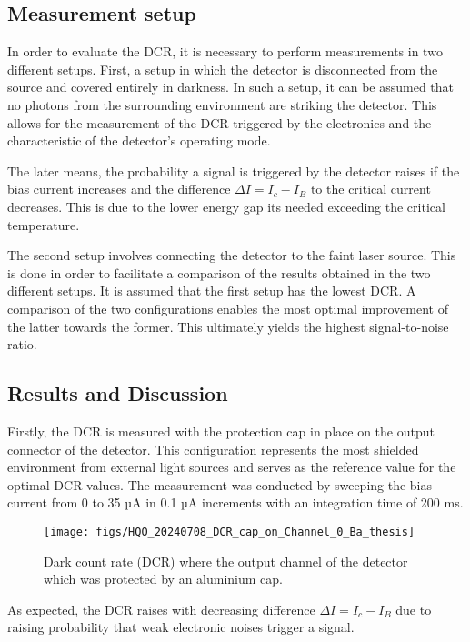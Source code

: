 \subsection*{Measurement setup}

In order to evaluate the DCR, it is necessary to perform measurements in two different setups.
First, a setup in which the detector is disconnected from the source and covered entirely in darkness.
In such a setup, it can be assumed that no photons from the surrounding environment are striking the detector.
This allows for the measurement of the DCR triggered by the electronics and the characteristic of the detector's operating mode.

The later means, the probability a signal is triggered by the detector raises if the bias current increases and the
difference $\Delta I= I_c - I_B$ to the critical current decreases.
This is due to the lower energy gap its needed exceeding the critical temperature.

The second setup involves connecting the detector to the faint laser source.
This is done in order to facilitate a comparison of the results obtained in the two different setups.
It is assumed that the first setup has the lowest DCR.
A comparison of the two configurations enables the most optimal improvement of the latter towards the former.
This ultimately yields the highest signal-to-noise ratio.

\subsection*{Results and Discussion}

Firstly, the DCR is measured with the protection cap in place on the output connector of the detector.
This configuration represents the most shielded environment from external light sources and serves as the reference
value for the optimal DCR values.
The measurement was conducted by sweeping the bias current from 0 to 35 µA in 0.1 µA increments with an
integration time of 200 ms.

\begin{figure}[hhh]
 \centering
 \texttt{[image: figs/HQO\_20240708\_DCR\_cap\_on\_Channel\_0\_Ba\_thesis]}
 \caption{Dark count rate (DCR) where the output channel of the detector which was protected by an aluminium cap.}
 \label{fig: DCR_Cap_on}
\end{figure}

As expected, the DCR raises with decreasing difference $ \Delta I= I_c - I_B$ due to raising probability that
weak electronic noises trigger a signal. \\

